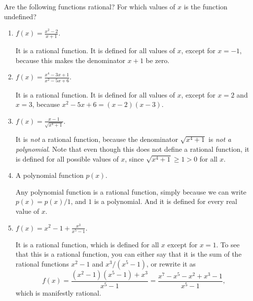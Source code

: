 \documentclass{ximera}
\begin{document}
\begin{example} Are the following functions rational? For which values of $x$ is the function undefined?
  \begin{enumerate}
  \item $f(x) = \frac{x^2-2}{x+1}$. \\[1em]
    \begin{explanation}
      It is a rational function. It is defined for all values of $x$, except for $x = -1$, because this makes the denominator $x+1$ be zero.
    \end{explanation}
  \item $f(x) = \frac{x^4-3x+1}{x^2-5x+6}$. \\[1em]
    \begin{explanation}
      It is a rational function. It is defined for all values of $x$, except for $x=2$ and $x=3$, because $x^2-5x+6 = (x-2)(x-3)$. 
    \end{explanation}
  \item $f(x) = \frac{x-1}{\sqrt{x^4+1}}$. \\[1em]
    \begin{explanation}
      It is \emph{not} a rational function, because the denominator $\sqrt{x^4+1}$ is \emph{not a polynomial}. Note that even though this does not define a rational function, it is defined for all possible values of $x$, since $\sqrt{x^4+1} \geq 1 > 0$ for all $x$.
    \end{explanation}
  \item A polynomial function $p(x)$. \\[1em]
    \begin{explanation}
      Any polynomial function is a rational function, simply because we can write $p(x) = p(x)/1$, and $1$ is a polynomial. And it is defined for every real value of $x$.
    \end{explanation}
  \item $f(x) = x^2-1 + \frac{x^3}{x^5-1}$. \\[1em]
    \begin{explanation}
      It is a rational function, which is defined for all $x$ except for $x=1$. To see that this is a rational function, you can either say that it is the sum of the rational functions $x^2-1$ and $x^3/(x^5-1)$, or rewrite it as $$  f(x) = \frac{(x^2-1)(x^5-1) + x^3}{x^5-1} = \frac{x^7-x^5-x^2+x^3-1}{x^5-1},  $$which is manifestly rational.
    \end{explanation}
  \end{enumerate}
\end{example}
\end{document}
